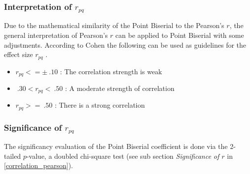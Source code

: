 \documentclass[a4paper,12pt]{report}
\begin{document}
%
%

\subsubsection{Interpretation of $r_{pq}$}
Due to the mathematical similarity of the Point Biserial to the Pearson's $r$, the general interpretation of Pearson's $r$ can be applied to Point Biserial with some adjustments. According to Cohen \cite{Cohen1988} the following can be used as guidelines for the effect size $r_{pq}$ \cite{Leblanc2017}.

\begin{itemize}
	\item $r_{pq} <= \pm \: .10$ : The correlation strength is weak
	\item $\: .30 < r_{pq} < \: .50$ : A moderate strength of correlation
	\item $r_{pq} >= \: .50$ : There is a strong correlation
\end{itemize}

\subsubsection{Significance of $r_{pq}$}
The significancy evaluation of the Point Biserial coefficient is done via the 2-tailed $p$-value, a doubled chi-square test (see sub section \textit{Significance of $r$} in \ref{correlation_pearson}).
\end{document}
